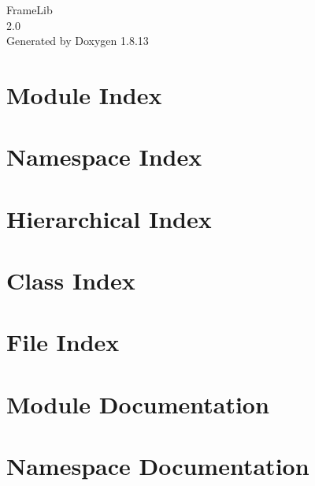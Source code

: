 \documentclass[twoside]{book}
\newcommand{\+}{\discretionary{\mbox{\scriptsize$\hookleftarrow$}}{}{}}
\newcommand{\clearemptydoublepage}{%
  \newpage{\pagestyle{empty}\cleardoublepage}%
}
\begin{document}
\hypersetup{pageanchor=false,
             bookmarksnumbered=true,
             pdfencoding=unicode
            }
\begin{titlepage}
\vspace*{7cm}
\begin{center}%
{\Large Frame\+Lib \\[1ex]\large 2.\+0 }\\
\vspace*{1cm}
{\large Generated by Doxygen 1.8.13}\\
\end{center}
\end{titlepage}
\clearemptydoublepage
{}
\tableofcontents
\clearemptydoublepage
{}
\hypersetup{pageanchor=true}

\chapter{Module Index}

\chapter{Namespace Index}

\chapter{Hierarchical Index}

\chapter{Class Index}

\chapter{File Index}

\chapter{Module Documentation}










\chapter{Namespace Documentation}

\end{document}
